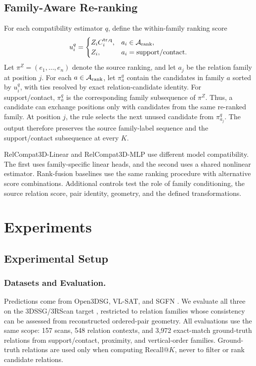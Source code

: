 \subsection{Family-Aware Re-ranking}
For each compatibility estimator $q$, define the within-family ranking score
\begin{equation}
u_i^q=\begin{cases}
Z_iC_i^{\rm tr,q}, & a_i\in\mathcal A_{\rm rank},\\
Z_i, & a_i=\mathrm{support/contact}.
\end{cases}
\end{equation}
Let $\pi^Z=(e_1,\ldots,e_n)$ denote the source ranking, and let $a_j$ be the relation family at position $j$. For each $a\in\mathcal A_{\rm rank}$, let $\pi_a^q$ contain the candidates in family $a$ sorted by $u_i^q$, with ties
resolved by exact relation-candidate identity. For support/contact, $\pi_a^q$ is the corresponding family subsequence of $\pi^Z$. Thus, a candidate can exchange positions only with candidates from the same re-ranked family. At position $j$, the rule selects the next unused candidate from $\pi_{a_j}^q$. The output therefore preserves the source family-label sequence and the support/contact subsequence at every $K$.

RelCompat3D-Linear and RelCompat3D-MLP use different model compatibility. The first uses family-specific linear heads, and the second uses a shared nonlinear estimator. Rank-fusion baselines use the same ranking procedure with alternative score combinations. Additional controls test the role of family conditioning, the source relation score, pair identity, geometry, and the defined transformations. 

\section{Experiments}
\subsection{Experimental Setup}
\subsubsection{Datasets and Evaluation.}
Predictions come from Open3DSG, VL-SAT, and SGFN \cite{wang2023vl,koch2024open3dsg,wu2021scenegraphfusion}. We evaluate all three on the 3DSSG/3RScan target \cite{wald2019rio,wald2020learning}, restricted to relation families whose consistency can be assessed from reconstructed ordered-pair geometry. All evaluations use the same scope: 157 scans, 548 relation contexts, and 3,972 exact-match ground-truth relations from support/contact, proximity, and vertical-order families. Ground-truth relations are used only when computing Recall@$K$, never to filter or rank candidate relations. 

